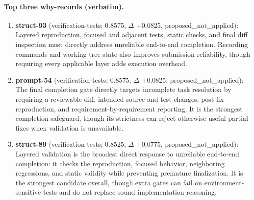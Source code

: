 \paragraph{Top three why-records (verbatim).}\begin{enumerate}\itemsep1pt
\item \textbf{struct-93} (verification-tests; 0.8575, $\Delta$ +0.0825, proposed\_not\_applied): Layered reproduction, focused and adjacent tests, static checks, and final diff inspection most directly address unreliable end-to-end completion. Recording commands and working-tree state also improves submission reliability, though requiring every applicable layer adds execution overhead.
\item \textbf{prompt-54} (verification-tests; 0.8575, $\Delta$ +0.0825, proposed\_not\_applied): The final completion gate directly targets incomplete task resolution by requiring a reviewable diff, intended source and test changes, post-fix reproduction, and requirement-by-requirement reporting. It is the strongest completion safeguard, though its strictness can reject otherwise useful partial fixes when validation is unavailable.
\item \textbf{struct-89} (verification-tests; 0.8525, $\Delta$ +0.0775, proposed\_not\_applied): Layered validation is the broadest direct response to unreliable end-to-end completion: it checks the reproduction, focused behavior, neighboring regressions, and static validity while preventing premature finalization. It is the strongest candidate overall, though extra gates can fail on environment-sensitive tests and do not replace sound implementation reasoning.
\end{enumerate}

